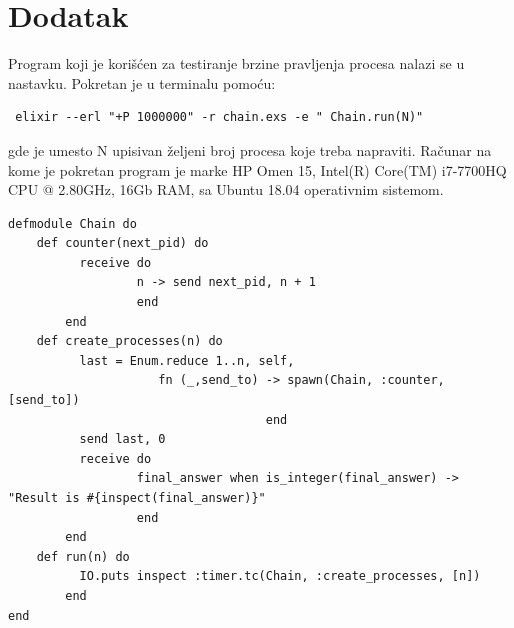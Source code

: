 \documentclass[a4paper]{article}
\begin{document}
\appendix
 


\newpage

\appendix
\section{Dodatak}
\label{sec:apendix}
Program koji je korišćen za testiranje brzine pravljenja procesa nalazi se u nastavku. Pokretan je u terminalu pomoću: \begin{verbatim} elixir --erl "+P 1000000" -r chain.exs -e " Chain.run(N)" \end{verbatim}
gde je umesto N upisivan željeni broj procesa koje treba napraviti. 
Računar na kome je pokretan program je marke HP Omen 15, Intel(R) Core(TM) i7-7700HQ CPU @ 2.80GHz, 16Gb RAM, sa Ubuntu 18.04 operativnim sistemom.

\begin{lstlisting}[caption={chain.exs},frame=none, label=simple]
defmodule Chain do
    def counter(next_pid) do    
          receive do
                  n -> send next_pid, n + 1
                  end
        end
    def create_processes(n) do
          last = Enum.reduce 1..n, self, 
                     fn (_,send_to) -> spawn(Chain, :counter, [send_to]) 
                                    end 
          send last, 0
          receive do
                  final_answer when is_integer(final_answer) -> "Result is #{inspect(final_answer)}"
                  end
        end
    def run(n) do
          IO.puts inspect :timer.tc(Chain, :create_processes, [n])
        end
end
\end{lstlisting}
\end{document}
